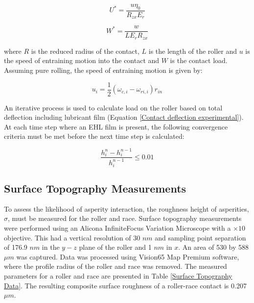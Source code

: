 \begin{enumerate}
	\begin{equation}\label{Ustar}
		U^*=\frac{u \eta_0}{R_{z x} E_r}
	\end{equation}
	
	\begin{equation}\label{Wstar}
		W^*=\frac{w}{L E_r R_{z x}}
	\end{equation}

	where $R$ is the reduced radius of the contact, $L$ is the length of the roller and $u$ is the speed of entraining motion into the contact and $W$ is the contact load. Assuming pure rolling, the speed of entraining motion is given by:
	
	\begin{equation}\label{entraining motion speed}
		u_i=\frac{1}{2}\left(\omega_{c, i}-\omega_{r i, i}\right) r_{i n}
	\end{equation}

	An iterative process is used to calculate load on the roller based on total deflection including lubricant film (Equation \ref{Contact deflection experimental}). At each time step where an EHL film is present, the following convergence criteria must be met before the next time step is calculated:
	
	\begin{equation}\label{film convergence}
		\frac{h_i^n-h_i^{n-1}}{h_i^{n-1}} \leq 0.01
	\end{equation}

\end{enumerate}

\subsection{Surface Topography Measurements} \label{Surface Topography}

To assess the likelihood of asperity interaction, the roughness height of asperities, ${\sigma}$, must be measured for the roller and race. Surface topography measurements were performed using an Alicona InfiniteFocus Variation Microscope with a $\times 10$ objective. This had a vertical resolution of 30 $nm$ and sampling point separation of 176.9 $nm$ in the $y-z$ plane of the roller and 1 $nm$ in $x$. An area of 530 by 588 $\mu m$ was captured. Data was processed using Vision65 Map Premium software, where the profile radius of the roller and race was removed. The measured parameters for a roller and race are presented in Table \ref{Surface Topography Data}. The resulting composite surface roughness of a roller-race contact is 0.207 $\mu m$.



